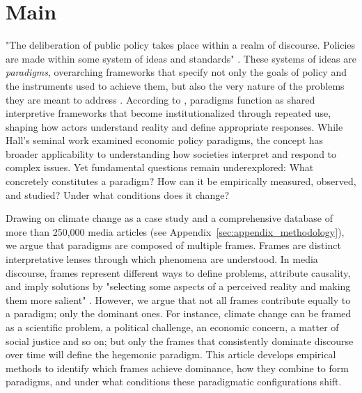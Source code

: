 \documentclass[12pt]{article}
\begin{document}

\section{Main}

"The deliberation of public policy takes place within a realm of discourse. Policies are made within some system of ideas and standards" \autocite[p. 279]{hallPolicyParadigmsSocial1993}. These systems of ideas are \emph{paradigms}, overarching frameworks that specify not only the goals of policy and the instruments used to achieve them, but also the very nature of the problems they are meant to address \autocite{hallPolicyParadigmsSocial1993}. According to \textcite{skogstadPolicyParadigmsTransnationalism2011}, paradigms function as shared interpretive frameworks that become institutionalized through repeated use, shaping how actors understand reality and define appropriate responses. While Hall's seminal work examined economic policy paradigms, the concept has broader applicability to understanding how societies interpret and respond to complex issues. Yet fundamental questions remain underexplored: What concretely constitutes a paradigm? How can it be empirically measured, observed, and studied? Under what conditions does it change? 

Drawing on climate change as a case study and a comprehensive database of more than 250,000 media articles (see Appendix~\ref{sec:appendix_methodology}), we argue that paradigms are composed of multiple frames. Frames are distinct interpretative lenses through which phenomena are understood. In media discourse, frames represent different ways to define problems, attribute causality, and imply solutions by "selecting some aspects of a perceived reality and making them more salient" \autocite[p. 52]{entmanFramingClarificationFractured1993b}. However, we argue that not all frames contribute equally to a paradigm; only the dominant ones. For instance, climate change can be framed as a scientific problem, a political challenge, an economic concern, a matter of social justice and so on; but only the frames that consistently dominate discourse over time will define the hegemonic paradigm. This article develops empirical methods to identify which frames achieve dominance, how they combine to form paradigms, and under what conditions these paradigmatic configurations shift.
\end{document}
